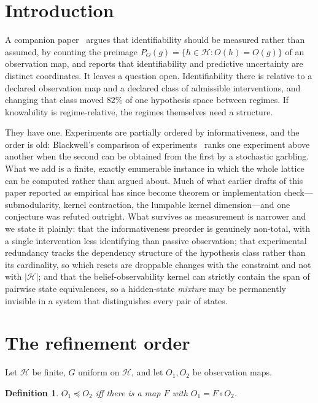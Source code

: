 \documentclass[11pt]{article}
\newtheorem{definition}[proposition]{Definition}
\newcommand{\HH}{\ensuremath{\mathcal{H}}}
\begin{document}
\section{Introduction}

A companion paper~\cite{paper1} argues that identifiability should be measured rather than
assumed, by counting the preimage $P_O(g) = \{h \in \HH : O(h) = O(g)\}$ of an observation
map, and reports that identifiability and predictive uncertainty are distinct coordinates.
It leaves a question open. Identifiability there is relative to a declared observation map
and a declared class of admissible interventions, and changing that class moved $82\%$ of
one hypothesis space between regimes. If knowability is regime-relative, the regimes
themselves need a structure.

They have one. Experiments are partially ordered by informativeness, and the order is old:
Blackwell's comparison of experiments~\cite{blackwell1953} ranks one experiment above
another when the second can be obtained from the first by a stochastic garbling. What we
add is a finite, exactly enumerable instance in which the whole lattice can be computed
rather than argued about. Much of what earlier drafts of this paper reported as empirical
has since become theorem or implementation check---submodularity, kernel contraction, the
lumpable kernel dimension---and one conjecture was refuted outright. What survives as
measurement is narrower and we state it plainly: that the informativeness preorder is
genuinely non-total, with a single intervention less identifying than passive observation; that
experimental redundancy tracks the dependency structure of the hypothesis class rather than
its cardinality, so which resets are droppable changes with the constraint and not with
$|\HH|$; and that the belief-observability kernel can strictly contain the span of pairwise
state equivalences, so a hidden-state \emph{mixture} may be permanently invisible in a
system that distinguishes every pair of states.

\section{The refinement order}

Let $\HH$ be finite, $G$ uniform on $\HH$, and let $O_1, O_2$ be observation maps.

\begin{definition}
$O_1 \preceq O_2$ iff there is a map $F$ with $O_1 = F \circ O_2$.
\end{definition}
\end{document}
